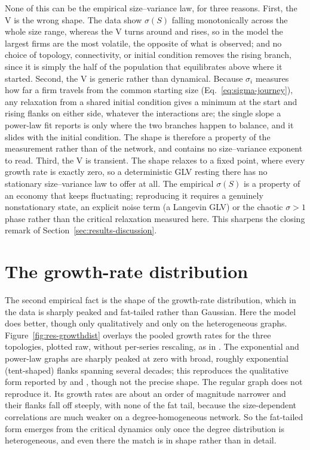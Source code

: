 None of this can be the empirical size--variance law, for three reasons. First, the V
is the wrong shape. The data show $\sigma(S)$ falling monotonically across the whole
size range, whereas the V turns around and rises, so in the model the largest firms
are the most volatile, the opposite of what is observed; and no choice of topology,
connectivity, or initial condition removes the rising branch, since it is simply the
half of the population that equilibrates above where it started. Second, the V is
generic rather than dynamical. Because $\sigma_i$ measures how far a firm travels from
the common starting size (Eq.~\eqref{eq:sigma-journey}), any relaxation from a shared
initial condition gives a minimum at the start and rising flanks on either side,
whatever the interactions are; the single slope a power-law fit reports is only where
the two branches happen to balance, and it slides with the initial condition. The
shape is therefore a property of the measurement rather than of the network, and contains no
size--variance exponent to read. Third, the V is transient. The shape relaxes to a
fixed point, where every growth rate is exactly zero, so a deterministic GLV resting
there has no stationary size--variance law to offer at all. The empirical $\sigma(S)$
is a property of an economy that keeps fluctuating; reproducing it requires a genuinely
nonstationary state, an explicit noise term (a Langevin GLV) or the chaotic $\sigma>1$
phase rather than the critical relaxation measured here. This sharpens the closing
remark of Section~\ref{sec:results-discussion}.

\section{The growth-rate distribution}
\label{sec:growthdist}

The second empirical fact is the shape of the growth-rate distribution, which in the
data is sharply peaked and fat-tailed rather than Gaussian. Here the model does
better, though only qualitatively and only on the heterogeneous graphs.
Figure~\ref{fig:res-growthdist} overlays the pooled growth rates for the three
topologies, plotted raw, without per-series rescaling, as in \citet{moran2024}. The
exponential and power-law graphs are sharply peaked at zero with broad, roughly
exponential (tent-shaped) flanks spanning several decades; this reproduces the
qualitative form reported by \citet{stanley1996} and \citet{amaral1997}, though not
the precise shape. The regular graph does not reproduce it. Its growth rates are about
an order of magnitude narrower and their flanks fall off steeply, with none of the fat
tail, because the size-dependent correlations are much weaker on a degree-homogeneous
network. So the fat-tailed form emerges from the critical dynamics only once the degree
distribution is heterogeneous, and even there the match is in shape rather than in detail.

